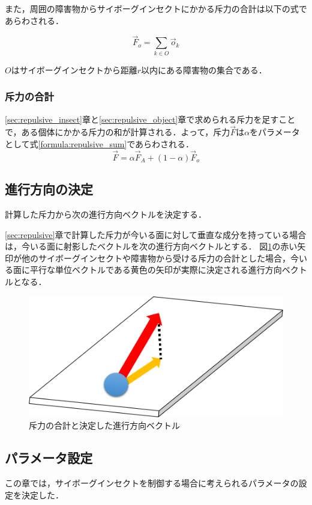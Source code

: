 \documentclass[a4paper,11pt]{jarticle}
\begin{document}
	また，周囲の障害物からサイボーグインセクトにかかる斥力の合計は以下の式であらわされる．
	
	\begin{equation}
	\vec{F}_o =　\sum_{k \in O}\vec{o}_k
	\label{formula:repalsive_object}
	\end{equation}
	
	$O$はサイボーグインセクトから距離$r$以内にある障害物の集合である．
	
	\subsubsection{斥力の合計}
	\ref{sec:repulsive_insect}章と\ref{sec:repulsive_object}章で求められる斥力を足すことで，ある個体にかかる斥力の和が計算される．よって，斥力$\vec{F}$は$\alpha$をパラメータとして式\ref{formula:repulsive_sum}であらわされる．
	\begin{equation}
	\vec{F} = \alpha\vec{F}_A + (1 - \alpha)\vec{F}_o
	\label{formula:repulsive_sum}
	\end{equation}
	
	
	\subsection{進行方向の決定}
	\label{sec:decide}
	計算した斥力から次の進行方向ベクトルを決定する．
	
	\ref{sec:repulsive}章で計算した斥力が今いる面に対して垂直な成分を持っている場合は，今いる面に射影したベクトルを次の進行方向ベクトルとする．
	図\ref{fig:repulsive}の赤い矢印が他のサイボーグインセクトや障害物から受ける斥力の合計とした場合，今いる面に平行な単位ベクトルである黄色の矢印が実際に決定される進行方向ベクトルとなる．
	\begin{figure}
		\centering
		\includegraphics[width=0.35\linewidth]{png/repulsive.png}
		\caption[斥力の射影]{斥力の合計と決定した進行方向ベクトル}
		\label{fig:repulsive}
	\end{figure}
	
	\subsection{パラメータ設定}
	この章では，サイボーグインセクトを制御する場合に考えられるパラメータの設定を決定した．
	
\end{document}
